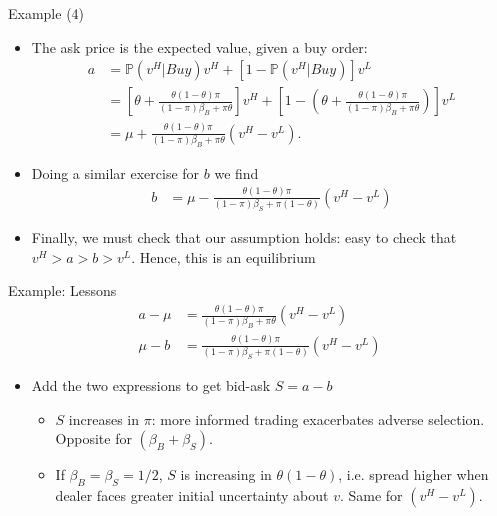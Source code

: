 \documentclass[english,10pt]{beamer}
\begin{document}
\begin{frame}{Example (4)}
\begin{itemize}
	\item The ask price is the expected value, given a buy order:
	\begin{align*}
		a 
		& = \mathbb{P}(v^H| Buy) v^H + [1-\mathbb{P}(v^H| Buy)] v^L \\
		& = \left[ \theta + \frac{\theta(1-\theta) \pi}{(1-\pi)\beta_B+\pi\theta} \right] v^H + \left[ 1 - \left( \theta + \frac{\theta(1-\theta) \pi}{(1-\pi)\beta_B+\pi\theta} \right) \right] v^L\\
		& = \mu + \frac{\theta(1-\theta) \pi}{(1-\pi)\beta_B+\pi\theta} (v^H -v^L).
	\end{align*}
	\item Doing a similar exercise for $b$ we find
	\begin{align*}
		b 		&= \mu - \frac{\theta(1-\theta) \pi}{(1-\pi)\beta_S+\pi(1-\theta)}(v^H-v^L)
	\end{align*}
	\item Finally, we must check that our assumption holds: easy to check that $v^H > a > b > v^L$. Hence, \alert{this is an equilibrium}
\end{itemize}
\end{frame}


\begin{frame}{Example: Lessons}
	\begin{align*}
	a - \mu 		&= \frac{\theta(1-\theta) \pi}{(1-\pi)\beta_B+\pi\theta}(v^H-v^L) \\
	\mu - b 		&= \frac{\theta(1-\theta) \pi}{(1-\pi)\beta_S+\pi(1-\theta)}(v^H-v^L)
	\end{align*}
	\begin{itemize}
		\item Add the two expressions to get bid-ask  $S = a-b$
		\begin{itemize}
			\item $S$ \alert{increases in $\pi$}: more informed trading exacerbates adverse selection. Opposite for $(\beta_B+\beta_S)$.
			\item If $\beta_B=\beta_S=1/2$, $S$ is \alert{increasing in $\theta(1-\theta)$}, i.e. spread higher when dealer faces greater initial uncertainty about $v$. Same for $(v^H-v^L)$.
		\end{itemize}
	\end{itemize}
\end{frame}
\end{document}
